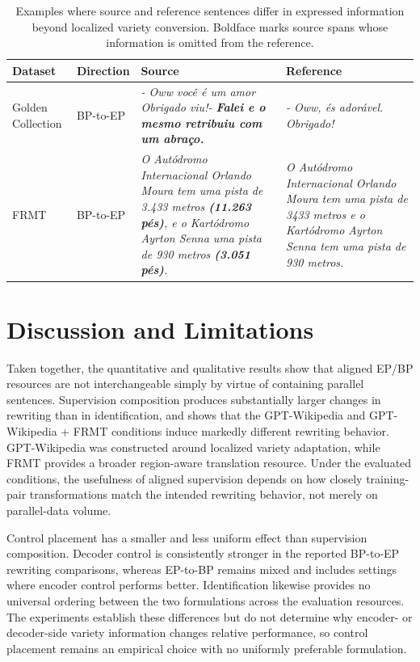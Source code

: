 \documentclass[acmtog,nonacm]{acmart}
\begin{document}
\begin{table}[tbp]
\centering
\small
\renewcommand{\arraystretch}{1.12}
\setlength{\tabcolsep}{3pt}
\caption{Examples where source and reference sentences differ in expressed information beyond localized variety conversion. Boldface marks source spans whose information is omitted from the reference.}
\label{tab:evaluation-reference-information-differences}
\begin{tabular}{@{}p{}p{}p{}p{}@{}}
\toprule
\textbf{Dataset} & \textbf{Direction} & \textbf{Source} & \textbf{Reference} \\
\midrule
Golden Collection &
BP-to-EP &
\textit{- Oww voc\^e \'e um amor Obrigado viu!- \textbf{Falei e o mesmo retribuiu com um abra\c{c}o.}} &
\textit{- Oww, \'es ador\'avel. Obrigado!} \\

FRMT &
BP-to-EP &
\textit{O Aut\'odromo Internacional Orlando Moura tem uma pista de 3.433 metros \textbf{(11.263 p\'es)}, e o Kart\'odromo Ayrton Senna uma pista de 930 metros \textbf{(3.051 p\'es)}.} &
\textit{O Aut\'odromo Internacional Orlando Moura tem uma pista de 3433 metros e o Kart\'odromo Ayrton Senna tem uma pista de 930 metros.} \\
\bottomrule
\end{tabular}
\end{table}

\section{Discussion and Limitations}
\label{sec:discussion-limitations}

Taken together, the quantitative and qualitative results show that aligned EP/BP resources are not interchangeable simply by virtue of containing parallel sentences. Supervision composition produces substantially larger changes in rewriting than in identification, and  shows that the GPT-Wikipedia and GPT-Wikipedia + FRMT conditions induce markedly different rewriting behavior. GPT-Wikipedia was constructed around localized variety adaptation, while FRMT provides a broader region-aware translation resource. Under the evaluated conditions, the usefulness of aligned supervision depends on how closely training-pair transformations match the intended rewriting behavior, not merely on parallel-data volume.

Control placement has a smaller and less uniform effect than supervision composition. Decoder control is consistently stronger in the reported BP-to-EP rewriting comparisons, whereas EP-to-BP remains mixed and includes settings where encoder control performs better. Identification likewise provides no universal ordering between the two formulations across the evaluation resources. The experiments establish these differences but do not determine why encoder- or decoder-side variety information changes relative performance, so control placement remains an empirical choice with no uniformly preferable formulation.
\end{document}
